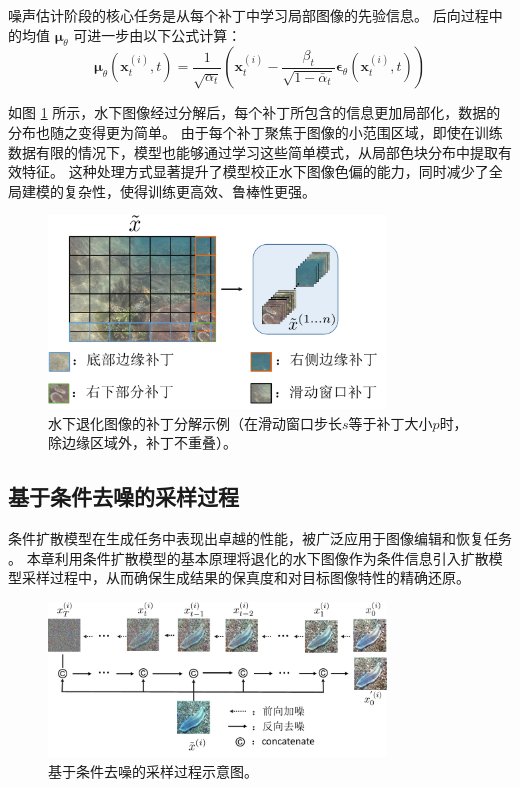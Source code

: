 噪声估计阶段的核心任务是从每个补丁中学习局部图像的先验信息。
后向过程中的均值 $\boldsymbol{\mu}_\theta$ 可进一步由以下公式计算：
\begin{equation}
    \boldsymbol{\mu}_\theta\left(\mathbf{x}^{(i)}_t, t\right)=\frac{1}{\sqrt{\alpha_t}}\left(\mathbf{x}^{(i)}_t-\frac{\beta_t}{\sqrt{1-\bar{\alpha}_t}} \boldsymbol{\epsilon}_\theta\left(\mathbf{x}^{(i)}_t, t\right)\right)
\end{equation}

如图 \ref{img:patch} 所示，水下图像经过分解后，每个补丁所包含的信息更加局部化，数据的分布也随之变得更为简单。
由于每个补丁聚焦于图像的小范围区域，即使在训练数据有限的情况下，模型也能够通过学习这些简单模式，从局部色块分布中提取有效特征。
这种处理方式显著提升了模型校正水下图像色偏的能力，同时减少了全局建模的复杂性，使得训练更高效、鲁棒性更强。
\begin{figure}[ht]
    \centering
    \includegraphics[width=0.8\textwidth]{figures/ch3/patch.pdf}
    \caption{水下退化图像的补丁分解示例（在滑动窗口步长$s$等于补丁大小$p$时，除边缘区域外，补丁不重叠）。}
    \label{img:patch}
\end{figure}


\subsection{基于条件去噪的采样过程}

条件扩散模型在生成任务中表现出卓越的性能，被广泛应用于图像编辑和恢复任务\cite{cDDPM} \cite{rst_DDPM}。
本章利用条件扩散模型的基本原理将退化的水下图像作为条件信息引入扩散模型采样过程中，从而确保生成结果的保真度和对目标图像特性的精确还原。
\begin{figure}
    \centering
    \includegraphics[width=0.8\textwidth]{figures/ch3/cond_ddpm.pdf}
    \caption{基于条件去噪的采样过程示意图。}
    \label{img:cond_ddpm}
\end{figure}

